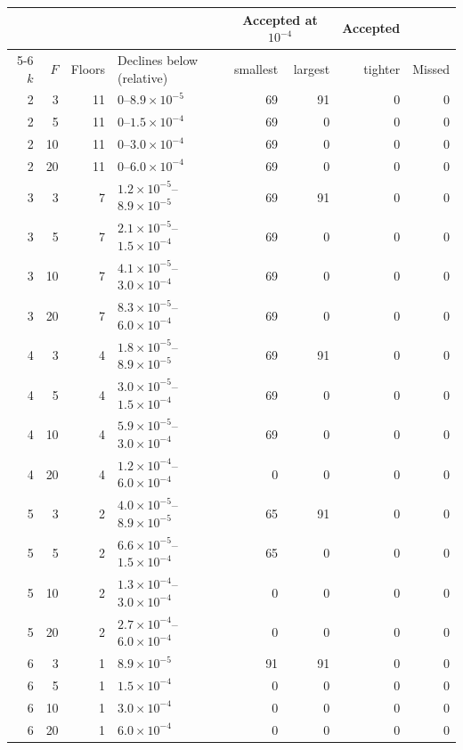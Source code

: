 \begin{tabular}{rrrlrrrr}
\toprule
& & & & \multicolumn{2}{c}{Accepted at $10^{-4}$} & Accepted & \\
\cmidrule(lr){5-6}
$k$ & $F$ & Floors & Declines below (relative) & smallest & largest & tighter & Missed \\
\midrule
2 & 3 & 11 & 0--$8.9{\times}10^{-5}$ & 69 & 91 & 0 & 0 \\
2 & 5 & 11 & 0--$1.5{\times}10^{-4}$ & 69 & 0 & 0 & 0 \\
2 & 10 & 11 & 0--$3.0{\times}10^{-4}$ & 69 & 0 & 0 & 0 \\
2 & 20 & 11 & 0--$6.0{\times}10^{-4}$ & 69 & 0 & 0 & 0 \\
3 & 3 & 7 & $1.2{\times}10^{-5}$--$8.9{\times}10^{-5}$ & 69 & 91 & 0 & 0 \\
3 & 5 & 7 & $2.1{\times}10^{-5}$--$1.5{\times}10^{-4}$ & 69 & 0 & 0 & 0 \\
3 & 10 & 7 & $4.1{\times}10^{-5}$--$3.0{\times}10^{-4}$ & 69 & 0 & 0 & 0 \\
3 & 20 & 7 & $8.3{\times}10^{-5}$--$6.0{\times}10^{-4}$ & 69 & 0 & 0 & 0 \\
4 & 3 & 4 & $1.8{\times}10^{-5}$--$8.9{\times}10^{-5}$ & 69 & 91 & 0 & 0 \\
4 & 5 & 4 & $3.0{\times}10^{-5}$--$1.5{\times}10^{-4}$ & 69 & 0 & 0 & 0 \\
4 & 10 & 4 & $5.9{\times}10^{-5}$--$3.0{\times}10^{-4}$ & 69 & 0 & 0 & 0 \\
4 & 20 & 4 & $1.2{\times}10^{-4}$--$6.0{\times}10^{-4}$ & 0 & 0 & 0 & 0 \\
5 & 3 & 2 & $4.0{\times}10^{-5}$--$8.9{\times}10^{-5}$ & 65 & 91 & 0 & 0 \\
5 & 5 & 2 & $6.6{\times}10^{-5}$--$1.5{\times}10^{-4}$ & 65 & 0 & 0 & 0 \\
5 & 10 & 2 & $1.3{\times}10^{-4}$--$3.0{\times}10^{-4}$ & 0 & 0 & 0 & 0 \\
5 & 20 & 2 & $2.7{\times}10^{-4}$--$6.0{\times}10^{-4}$ & 0 & 0 & 0 & 0 \\
6 & 3 & 1 & $8.9{\times}10^{-5}$ & 91 & 91 & 0 & 0 \\
6 & 5 & 1 & $1.5{\times}10^{-4}$ & 0 & 0 & 0 & 0 \\
6 & 10 & 1 & $3.0{\times}10^{-4}$ & 0 & 0 & 0 & 0 \\
6 & 20 & 1 & $6.0{\times}10^{-4}$ & 0 & 0 & 0 & 0 \\
\bottomrule
\end{tabular}
